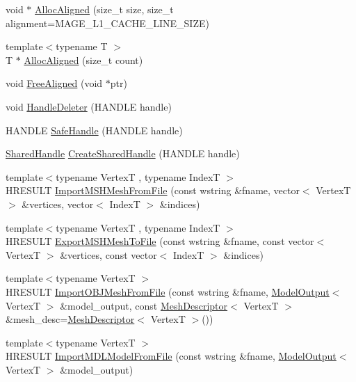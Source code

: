 \begin{DoxyCompactItemize}
\item 
void $\ast$ \hyperlink{namespacemage_a4770c97ad241a87982062034adb6c0dc}{Alloc\+Aligned} (size\+\_\+t size, size\+\_\+t alignment=M\+A\+G\+E\+\_\+\+L1\+\_\+\+C\+A\+C\+H\+E\+\_\+\+L\+I\+N\+E\+\_\+\+S\+I\+ZE)
\item 
{\footnotesize template$<$typename T $>$ }\\T $\ast$ \hyperlink{namespacemage_a43e2cdb4c71637a86b1861a73be44a58}{Alloc\+Aligned} (size\+\_\+t count)
\item 
void \hyperlink{namespacemage_a401c54df21447c491c527735647b5f80}{Free\+Aligned} (void $\ast$ptr)
\item 
void \hyperlink{namespacemage_ab8f0b2f46629338cab3de903274f1747}{Handle\+Deleter} (H\+A\+N\+D\+LE handle)
\item 
H\+A\+N\+D\+LE \hyperlink{namespacemage_a80f95ce7eb0d03d5576351663d626b4d}{Safe\+Handle} (H\+A\+N\+D\+LE handle)
\item 
\hyperlink{namespacemage_ab892828913d6129acf71e0cec60467e5}{Shared\+Handle} \hyperlink{namespacemage_a3119898d7caac71d8ee495c3ae3194b1}{Create\+Shared\+Handle} (H\+A\+N\+D\+LE handle)
\item 
{\footnotesize template$<$typename VertexT , typename IndexT $>$ }\\H\+R\+E\+S\+U\+LT \hyperlink{namespacemage_aecd62c2ba58f3dd536459d4b6157f581}{Import\+M\+S\+H\+Mesh\+From\+File} (const wstring \&fname, vector$<$ VertexT $>$ \&vertices, vector$<$ IndexT $>$ \&indices)
\item 
{\footnotesize template$<$typename VertexT , typename IndexT $>$ }\\H\+R\+E\+S\+U\+LT \hyperlink{namespacemage_ad7382e78b94a6bf97895c8bfd198976b}{Export\+M\+S\+H\+Mesh\+To\+File} (const wstring \&fname, const vector$<$ VertexT $>$ \&vertices, const vector$<$ IndexT $>$ \&indices)
\item 
{\footnotesize template$<$typename VertexT $>$ }\\H\+R\+E\+S\+U\+LT \hyperlink{namespacemage_acb4aa2ee8f4bb362e8cce1fe22e0adbf}{Import\+O\+B\+J\+Mesh\+From\+File} (const wstring \&fname, \hyperlink{structmage_1_1_model_output}{Model\+Output}$<$ VertexT $>$ \&model\+\_\+output, const \hyperlink{structmage_1_1_mesh_descriptor}{Mesh\+Descriptor}$<$ VertexT $>$ \&mesh\+\_\+desc=\hyperlink{structmage_1_1_mesh_descriptor}{Mesh\+Descriptor}$<$ VertexT $>$())
\item 
{\footnotesize template$<$typename VertexT $>$ }\\H\+R\+E\+S\+U\+LT \hyperlink{namespacemage_a3f0f8c54f76f76ed7081fd3c960e482d}{Import\+M\+D\+L\+Model\+From\+File} (const wstring \&fname, \hyperlink{structmage_1_1_model_output}{Model\+Output}$<$ VertexT $>$ \&model\+\_\+output)

\end{DoxyCompactItemize}
